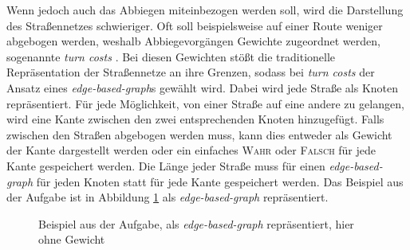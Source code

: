 \documentclass[a4paper,10pt,ngerman]{scrartcl}
\begin{document}
Wenn jedoch auch das Abbiegen miteinbezogen werden soll, wird die Darstellung des Straßennetzes schwieriger.
Oft soll beispielsweise auf einer Route weniger abgebogen werden, weshalb Abbiegevorgängen Gewichte zugeordnet werden, sogenannte \textit{turn costs} \cite{geisberger}.
Bei diesen Gewichten stößt die traditionelle Repräsentation der Straßennetze an ihre Grenzen, sodass bei \textit{turn costs} der Ansatz eines \textit{edge-based-graph}s gewählt wird.
Dabei wird jede Straße als Knoten repräsentiert.
Für jede Möglichkeit, von einer Straße auf eine andere zu gelangen, wird eine Kante zwischen den zwei entsprechenden Knoten hinzugefügt.
Falls zwischen den Straßen abgebogen werden muss, kann dies entweder als Gewicht der Kante dargestellt werden oder ein einfaches \textsc{Wahr} oder \textsc{Falsch} für jede Kante gespeichert werden.
Die Länge jeder Straße muss für einen \textit{edge-based-graph} für jeden Knoten statt für jede Kante gespeichert werden.
Das Beispiel aus der Aufgabe ist in Abbildung \ref{fig:edge-based-graph} als \textit{edge-based-graph} repräsentiert.

\begin{figure}
\centering
{}
\caption{Beispiel aus der Aufgabe, als \textit{edge-based-graph} repräsentiert, hier ohne Gewicht}
\label{fig:edge-based-graph}
\end{figure}
\end{document}
